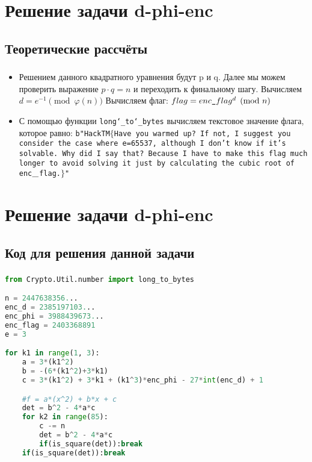 \documentclass[t]{beamer}
\begin{document}
\section{Решение задачи d-phi-enc}
\subsection{Теоретические рассчёты}
\begin{frame}[t] %
	\frametitle{\insertsection}
	\framesubtitle{\insertsubsection}
        \begin{itemize}
            \item Решением данного квадратного уравнения будут p и q. Далее мы можем проверить выражение $p \cdot q=n$ и переходить к финальному шагу.\newline
            Вычисляем $d = e^{-1}\pmod{\varphi(n)}$\newline
            Вычисляем флаг: $flag = \texttt{$enc\char`_flag^d \pmod{n}$}$\newline
            \item С помощью функции \texttt{long\char`_to\char`_bytes} вычисляем текстовое значение флага, которое равно:\newline
            \texttt{b"HackTM$\{$Have you warmed up? If not, I suggest you consider the case where e=65537, although I don't know if it's solvable. Why did I say that? Because I have to make this flag much longer to avoid solving it just by calculating the cubic root of enc$\char`_$flag.$\}$"}
	\end{itemize}
\end{frame}

\section{Решение задачи d-phi-enc}
\subsection{Код для решения данной задачи}
\begin{frame}[fragile]
	\frametitle{\insertsection} 
	\framesubtitle{\insertsubsection}
	\footnotesize
	\smaller
\begin{lstlisting}[language=Python]
from Crypto.Util.number import long_to_bytes

n = 2447638356...
enc_d = 2385197103...
enc_phi = 3988439673...
enc_flag = 2403368891
e = 3

for k1 in range(1, 3):
    a = 3*(k1^2)
    b = -(6*(k1^2)+3*k1)
    c = 3*(k1^2) + 3*k1 + (k1^3)*enc_phi - 27*int(enc_d) + 1

    #f = a*(x^2) + b*x + c
    det = b^2 - 4*a*c
    for k2 in range(85):
        c -= n
        det = b^2 - 4*a*c
        if(is_square(det)):break
    if(is_square(det)):break
\end{lstlisting}	
\end{frame}
\end{document}
